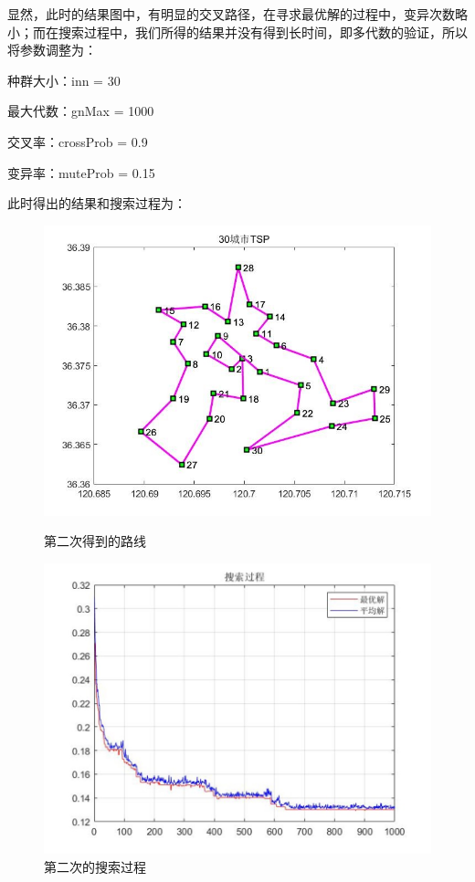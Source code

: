 \documentclass{article}
\begin{document}
显然，此时的结果图中，有明显的交叉路径，在寻求最优解的过程中，变异次数略小；而在搜索过程中，我们所得的结果并没有得到长时间，即多代数的验证，所以将参数调整为：

种群大小：inn = 30

最大代数：gnMax = 1000

交叉率：crossProb = 0.9

变异率：muteProb = 0.15

此时得出的结果和搜索过程为：
\vspace{0.5ex}
\begin{figure}[hbt]
	\begin{minipage}[t]{0.5\textwidth}
		\centering
		\includegraphics[scale=0.47]{7.3.jpg}
		\caption{第二次得到的路线}
	\end{minipage}
	\qquad
	\begin{minipage}[t]{0.5\textwidth}
		\centering
		\includegraphics[scale=0.57]{7.4.jpg}
		\caption{第二次的搜索过程}
	\end{minipage}
\end{figure}
\vspace{0.5ex}
\end{document}
